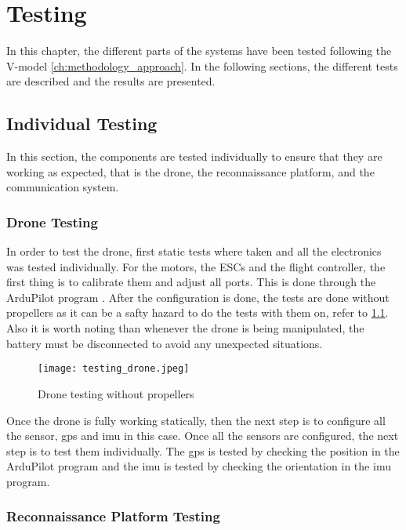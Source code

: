 \chapter{Testing}\label{ch:testing}

In this chapter, the different parts of the systems have been tested following the V-model \cref{ch:methodology_approach}. In the following sections, the different tests are described and the results are presented.

\section{Individual Testing}\label{sec:individual_testing}

In this section, the components are tested individually to ensure that they are working as expected, that is the drone, the reconnaissance platform, and the communication system.

\subsection{Drone Testing}\label{subsec:drone_testing}

In order to test the drone, first static tests where taken and all the electronics was tested individually. For the motors, the ESCs and the flight controller, the first thing is to calibrate them and adjust all ports. This is done through the ArduPilot program \autocite{ardupilotMissionPlanner}. After the configuration is done, the tests are done without propellers as it can be a safty hazard to do the tests with them on, refer to \cref{fig:drone_testing}. Also it is worth noting than whenever the drone is being manipulated, the battery must be disconnected to avoid any unexpected situations.

\begin{figure}
	\texttt{[image: testing\_drone.jpeg]}
	\caption{Drone testing without propellers}\label{fig:drone_testing}
\end{figure}

Once the drone is fully working statically, then the next step is to configure all the sensor, \gls{gps} and \gls{imu} in this case. Once all the sensors are configured, the next step is to test them individually. The \gls{gps} is tested by checking the position in the ArduPilot program and the \gls{imu} is tested by checking the orientation in the \gls{imu} program.

\subsection{Reconnaissance Platform Testing}\label{subsec:reconnaissance_platform_testing}

